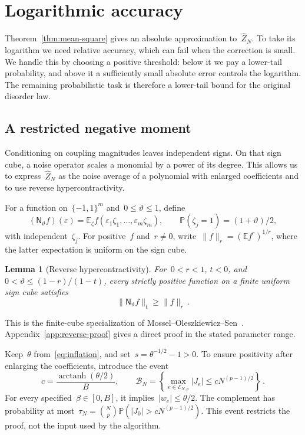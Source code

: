 \documentclass[10pt]{article}
\theoremstyle{plain}
\newtheorem{lemma}[theorem]{Lemma}
\theoremstyle{definition}
\theoremstyle{remark}
\renewcommand{\epsilon}{\varepsilon}
\begin{document}
\section{Logarithmic accuracy}\label{sec:logarithm}
Theorem~\ref{thm:mean-square} gives an absolute approximation to~$\hat Z_N$. To take its logarithm we need relative accuracy, which can fail when the correction is small. We handle this by choosing a positive threshold: below it we pay a lower-tail probability, and above it a sufficiently small absolute error controls the logarithm. The remaining probabilistic task is therefore a lower-tail bound for the original disorder law.

\subsection{A restricted negative moment}
Conditioning on coupling magnitudes leaves independent signs. On that sign cube, a noise operator scales a monomial by a power of its degree. This allows us to express~$\hat Z_N$ as the noise average of a polynomial with enlarged coefficients and to use reverse hypercontractivity.

For a function on~$\{-1,1\}^m$ and~$0\le\vartheta\le1$, define
\begin{equation*}
 (\mathsf N_\vartheta f)(\epsilon)
 =\mathbb E_\zeta f(\epsilon_1\zeta_1,\ldots,\epsilon_m\zeta_m),
 \qquad \mathbb P(\zeta_j=1)=(1+\vartheta)/2,
\end{equation*}
with independent~$\zeta_j$. For positive~$f$ and~$r\ne0$, write~$\|f\|_r=(\mathbb E f^r)^{1/r}$, where the latter expectation is uniform on the sign cube.
\begin{lemma}[Reverse hypercontractivity]\label{lem:reverse}
For~$0<r<1$, $t<0$, and~$0<\vartheta\le(1-r)/(1-t)$, every strictly positive function on a finite uniform sign cube satisfies
\begin{equation}\label{eq:reverse}
 \|\mathsf N_\vartheta f\|_t\ge\|f\|_r\,.
\end{equation}
\end{lemma}
This is the finite-cube specialization of Mossel--Oleszkiewicz--Sen~\cite[Corollary~1.11]{MOS13}. Appendix~\ref{app:reverse-proof} gives a direct proof in the stated parameter range.

Keep~$\theta$ from~\eqref{eq:inflation}, and set~$s=\theta^{-1/2}-1>0$. To ensure positivity after enlarging the coefficients, introduce the event
\begin{equation}\label{eq:large-event}
 c=\frac{\operatorname{arctanh}(\theta/2)}{B},\qquad
 \mathcal B_N=\left\{\max_{e\in\mathcal E_{N,p}}|J_e|\le cN^{(p-1)/2}\right\}\,.
\end{equation}
For every specified~$\beta\in[0,B]$, it implies~$|w_e|\le\theta/2$. The complement has probability at most~$\tau_N=\binom Np\mathbb P(|J_0|>cN^{(p-1)/2})$. This event restricts the proof, not the input used by the algorithm.
\end{document}
